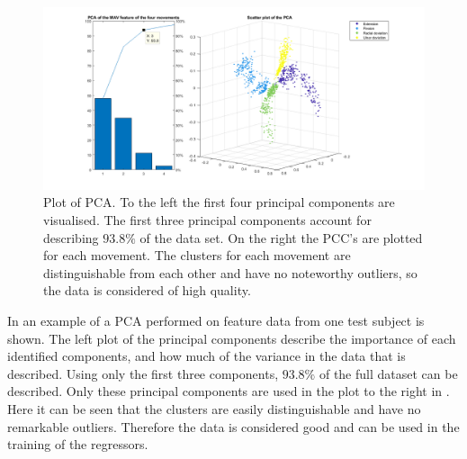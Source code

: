\begin{figure}[H]
	\includegraphics[width=.4\textwidth]{figures/Methods/pcasubplot.png} 
	\caption{Plot of PCA. To the left the first four principal components are visualised. The first three principal components account for describing $93.8\%$ of the data set. On the right the PCC's are plotted for each movement. The clusters for each movement are distinguishable from each other and have no noteworthy outliers, so the data is considered of high quality.} 
	\label{fig:pcasubplot}
\end{figure} 

In  an example of a PCA performed on feature data from one test subject is shown. The left plot of the principal components describe the importance of each identified components, and how much of the variance in the data that is described. Using only the first three components, $93.8\%$ of the full dataset can be described. Only these principal components are used in the plot to the right in . Here it can be seen that the clusters are easily distinguishable and have no remarkable outliers. Therefore the data is considered good and can be used in the training of the regressors. 



